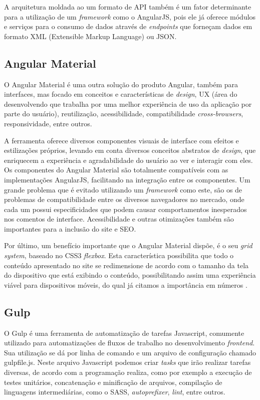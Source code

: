 A arquitetura moldada ao um formato de API também é um fator determinante para a utilização de um \textit{framework} como o AngularJS, pois ele já oferece módulos e serviços para o consumo de dados através de \textit{endpoints} que forneçam dados em formato XML (Extensible Markup Language) ou JSON.

\subsection{Angular Material}
O Angular Material \cite{angular-material} é uma outra solução do produto Angular, também para interfaces, mas focado em conceitos e características de \textit{design}, UX (área do desenvolvendo que trabalha por uma melhor experiência de uso da aplicação por parte do usuário), reutilização, acessibilidade, compatibilidade \textit{cross-browsers}, responsividade, entre outros. 

A ferramenta oferece diversos componentes visuais de interface com efeitos e estilizações próprios, levando em conta diversos conceitos abstratos de \textit{design}, que enriquecem a experiência e agradabilidade do usuário ao ver e interagir com eles. Os componentes do Angular Material são totalmente compatíveis com as implementações AngularJS, facilitando na integração entre os componentes. Um grande problema que é evitado utilizando um \textit{framework} como este, são os de problemas de compatibilidade entre os diversos navegadores no mercado, onde cada um possui especificidades que podem causar comportamentos inesperados nos comentos de interface. Acessibilidade e outras otimizações também são importantes para a inclusão do site e SEO.

Por último, um benefício importante que o Angular Material dispõe, é o seu \textit{grid system}, baseado no CSS3 \textit{flexbox}. Esta característica possibilita que todo o conteúdo apresentado no site se redimensione de acordo com o tamanho da tela do dispositivo que está exibindo o conteúdo, possibilitando assim uma experiência viável para dispositivos móveis, do qual já citamos a importância em números \cite{internet-traffic-stats1} \cite{internet-traffic-stats2} \cite{internet-traffic-stats3}.  

\subsection{Gulp}
O Gulp \cite{gulp} é uma ferramenta de automatização de tarefas Javascript, comumente utilizado para automatizações de fluxos de trabalho no desenvolvimento \textit{frontend}. Sua utilização se dá por linha de comando e um arquivo de configuração chamado gulpfile.js. Neste arquivo Javascript podemos criar \textit{tasks} que irão realizar tarefas diversas, de acordo com a programação realiza, como por exemplo a execução de testes unitários, concatenação e minificação de arquivos, compilação de linguagens intermediárias, como o SASS, \textit{autoprefixer}, \textit{lint}, entre outros.

